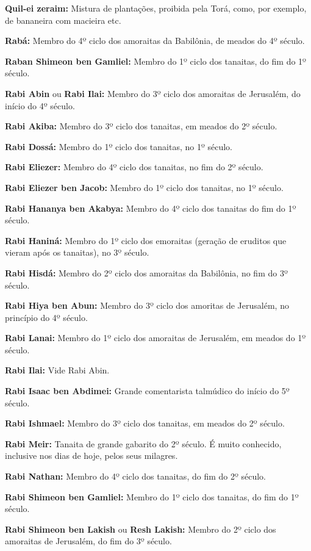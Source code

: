 \begin{hangparas}{.25in}{1}
{\textbf{Quil-ei zeraim:} Mistura de plantações, proibida pela Torá,
como, por exemplo, de bananeira com macieira etc.

\textbf{Rabá:} Membro do 4º ciclo dos amoraitas da Babilônia, de
meados do 4º século.

\textbf{Raban Shimeon ben Gamliel:} Membro do 1º ciclo dos tanaitas,
do fim do 1º século.

\textbf{Rabi Abin} ou \textbf{Rabi Ilai:} Membro do
3º ciclo dos amoraitas de Jerusalém, do início do 4º século.

\textbf{Rabi Akiba:} Membro do 3º ciclo dos tanaitas, em meados do 2º
século.

\textbf{Rabi Dossá:} Membro do 1º ciclo dos tanaitas, no 1º século.

\textbf{Rabi Eliezer:} Membro do 4º ciclo dos tanaitas, no fim do 2º século.

\textbf{Rabi Eliezer ben Jacob:} Membro do 1º ciclo dos tanaitas, no 1º século.

\textbf{Rabi Hananya ben Akabya:} Membro do 4º ciclo dos tanaitas do fim do 1º século.

\textbf{Rabi Haniná:} Membro do 1º ciclo dos emoraitas (geração de eruditos que vieram após os tanaitas), no 3º século.

\textbf{Rabi Hisdá:} Membro do 2º ciclo dos amoraitas da Babilônia, no fim do 3º século.

\textbf{Rabi Hiya ben Abun:} Membro do 3º ciclo dos amoritas de
Jerusalém, no princípio do 4º século.

\textbf{Rabi Lanai:} Membro do 1º ciclo dos amoraitas de Jerusalém, em meados do 1º século.

\textbf{Rabi Ilai:} Vide Rabi Abin.

\textbf{Rabi Isaac ben Abdimei:} Grande comentarista talmúdico do
início do 5º século.

\textbf{Rabi Ishmael:} Membro do 3º ciclo dos tanaitas, em meados do 2º
século.

\textbf{Rabi Meir:} Tanaita de grande gabarito do 2º século. É muito
conhecido, inclusive nos dias de hoje, pelos seus milagres.

\textbf{Rabi Nathan:} Membro do 4º ciclo dos tanaitas, do fim do 2º
século.

\textbf{Rabi Shimeon ben Gamliel:} Membro do 1º ciclo dos
tanaitas, do fim do 1º século.

\textbf{Rabi Shimeon ben Lakish} ou \textbf{Resh Lakish:} Membro do 2º
ciclo dos amoraitas de Jerusalém, do fim do 3º século.

}
\end{hangparas}

